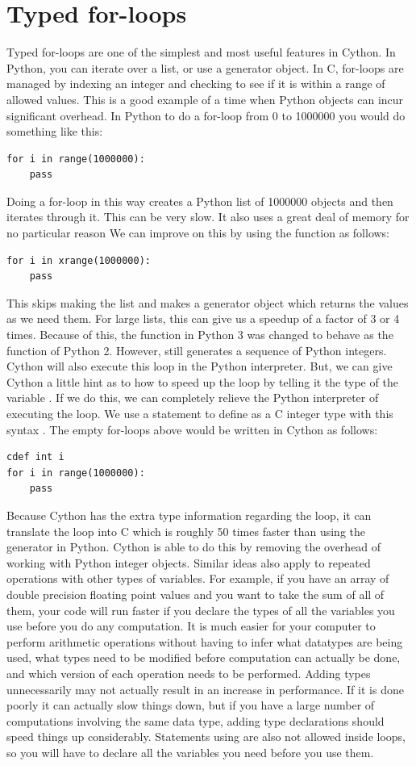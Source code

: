 \section*{Typed for-loops}
Typed for-loops are one of the simplest and most useful features in Cython.
In Python, you can iterate over a list, or use a generator object.
In C, for-loops are managed by indexing an integer and checking to see if it is within a range of allowed values.
This is a good example of a time when Python objects can incur significant overhead.
In Python to do a for-loop from 0 to 1000000 you would do something like this:
\begin{lstlisting}
for i in range(1000000):
    pass
\end{lstlisting}
Doing a for-loop in this way creates a Python list of 1000000 objects and then iterates through it.
This can  be very slow.
It also uses a great deal of memory for no particular reason
We can improve on this by using the  function as follows:
\begin{lstlisting}
for i in xrange(1000000):
    pass
\end{lstlisting}
This skips making the list and makes a generator object which returns the values as we need them.
For large lists, this can give us a speedup of a factor of 3 or 4 times.
Because of this, the  function in Python 3 was changed to behave as the  function of Python 2.
However,  still generates a sequence of Python integers.
Cython will also execute this loop in the Python interpreter.
But, we can give Cython a little hint as to how to speed up the loop by telling it the type of the variable .
If we do this, we can completely relieve the Python interpreter of executing the loop.
We use a  statement to define  as a C integer type with this syntax .
The empty for-loops above would be written in Cython as follows:
\begin{lstlisting}
cdef int i
for i in range(1000000):
    pass
\end{lstlisting}
Because Cython has the extra type information regarding the loop, it can translate the loop into C which is roughly 50 times faster than using the generator in Python.
Cython is able to do this by removing the overhead of working with Python integer objects.
Similar ideas also apply to repeated operations with other types of variables.
For example, if you have an array of double precision floating point values and you want to take the sum of all of them, your code will run faster if you declare the types of all the variables you use before you do any computation.
It is much easier for your computer to perform arithmetic operations without having to infer what datatypes are being used, what types need to be modified before computation can actually be done, and which version of each operation needs to be performed.
Adding types unnecessarily may not actually result in an increase in performance. If it is done poorly it can actually slow things down, but if you have a large number of computations involving the same data type, adding type declarations should speed things up considerably.
Statements using  are also not allowed inside loops, so you will have to declare all the variables you need before you use them.

